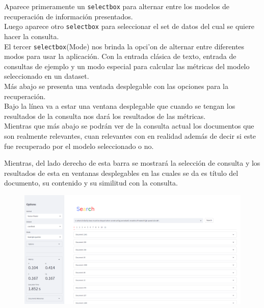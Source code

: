 \documentclass[spanish]{article}
\begin{document}
\begin{multicols}{2}
		Aparece primeramente un \texttt{selectbox} para alternar entre los modelos de recuperación de información presentados.\\

		Luego aparece otro \texttt{selectbox} para seleccionar el set de datos del cual se quiere hacer la consulta.\\

		El tercer \texttt{selectbox}(Mode) nos brinda la opci'on de alternar entre diferentes modos para usar la aplicación. Con la entrada clásica de texto, entrada de consultas de ejemplo y un modo especial para calcular las métricas del modelo seleccionado en un dataset. \\

		Más abajo se presenta una ventada desplegable con las opciones para la recuperación.\\

		Bajo la línea va a estar una ventana desplegable que cuando se tengan los resultados de la consulta nos dará los resultados de las métricas.\\

		Mientras que más abajo se podrán ver de la consulta actual los documentos que son realmente relevantes, cuan relevantes con en realidad además de decir si este fue recuperado por el modelo seleccionado o no.\\
	\end{multicols}
		
		

		Mientras, del lado derecho de esta barra se mostrará la selección de consulta y los resultados de esta en ventanas desplegables en las cuales se da es título del documento, su contenido y su similitud con la consulta.

		\begin{figure}[H]
			\includegraphics[scale=0.38]{fullscreen.png}
		\end{figure}
		
\end{document}
